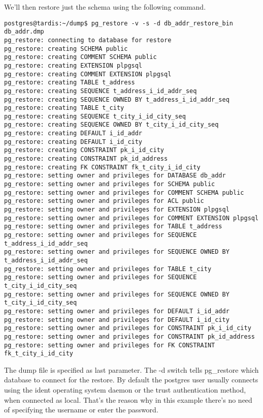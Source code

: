 We'll then restore just the schema using the following command.

\begin{verbatim}
postgres@tardis:~/dump$ pg_restore -v -s -d db_addr_restore_bin db_addr.dmp 
pg_restore: connecting to database for restore
pg_restore: creating SCHEMA public
pg_restore: creating COMMENT SCHEMA public
pg_restore: creating EXTENSION plpgsql
pg_restore: creating COMMENT EXTENSION plpgsql
pg_restore: creating TABLE t_address
pg_restore: creating SEQUENCE t_address_i_id_addr_seq
pg_restore: creating SEQUENCE OWNED BY t_address_i_id_addr_seq
pg_restore: creating TABLE t_city
pg_restore: creating SEQUENCE t_city_i_id_city_seq
pg_restore: creating SEQUENCE OWNED BY t_city_i_id_city_seq
pg_restore: creating DEFAULT i_id_addr
pg_restore: creating DEFAULT i_id_city
pg_restore: creating CONSTRAINT pk_i_id_city
pg_restore: creating CONSTRAINT pk_id_address
pg_restore: creating FK CONSTRAINT fk_t_city_i_id_city
pg_restore: setting owner and privileges for DATABASE db_addr
pg_restore: setting owner and privileges for SCHEMA public
pg_restore: setting owner and privileges for COMMENT SCHEMA public
pg_restore: setting owner and privileges for ACL public
pg_restore: setting owner and privileges for EXTENSION plpgsql
pg_restore: setting owner and privileges for COMMENT EXTENSION plpgsql
pg_restore: setting owner and privileges for TABLE t_address
pg_restore: setting owner and privileges for SEQUENCE t_address_i_id_addr_seq
pg_restore: setting owner and privileges for SEQUENCE OWNED BY t_address_i_id_addr_seq
pg_restore: setting owner and privileges for TABLE t_city
pg_restore: setting owner and privileges for SEQUENCE t_city_i_id_city_seq
pg_restore: setting owner and privileges for SEQUENCE OWNED BY t_city_i_id_city_seq
pg_restore: setting owner and privileges for DEFAULT i_id_addr
pg_restore: setting owner and privileges for DEFAULT i_id_city
pg_restore: setting owner and privileges for CONSTRAINT pk_i_id_city
pg_restore: setting owner and privileges for CONSTRAINT pk_id_address
pg_restore: setting owner and privileges for FK CONSTRAINT fk_t_city_i_id_city

\end{verbatim}

The dump file is specified as last parameter. The -d switch tells pg\_restore which database to 
connect for the restore. By default the postgres user usually connects using the ident 
operating system daemon or the trust authentication method, when connected as local. That's the 
reason why in this example there's no need of specifying the username or enter the 
password.\newline 

